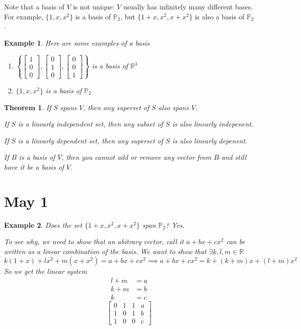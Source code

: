 \documentclass[11pt]{article}
\newtheorem{thm}{Theorem}
\newtheorem{ex}{Example}
\begin{document}
Note that a basis of $V$ is not unique: $V$ usually has infinitely many different bases.
For example, $\{1,x,x^{2}\}$ is a basis of $\mathbb{P}_{2}$, but $\{1 + x, x^{2}, x + x^{2}\}$ is also a basis of $\mathbb{P}_{2}$.
\begin{ex}
  Here are some examples of a basis
  \begin{enumerate}
    \item $\left\{\begin{bmatrix} 1 \\ 0 \\ 0 \end{bmatrix}, \begin{bmatrix} 0 \\ 1 \\ 0 \end{bmatrix}, \begin{bmatrix} 0 \\ 0 \\ 1 \end{bmatrix}\right\}$ is a basis of $\mathbb{R}^{3}$
    \item $\{1, x, x^{2}\}$ is a basis of $\mathbb{P}_{2}$

  \end{enumerate}
\end{ex}

\begin{thm}
  If $S$ spans $V$, then any superset of $S$ also spans $V$.

  If $S$ is a linearly independent set, then any subset of $S$ is also linearly indepenent.

  If $S$ is a linearly dependent set, then any superset of $S$ is also linearly depenent.

  If $B$ is a basis of $V$, then you cannot add or remove any vector from $B$ and still have it be a basis of $V$.
\end{thm}
\section{May 1}
\begin{ex}
  Does the set $\{1+x, x^{2},x+x^{2}\}$ span $\mathbb{P}_{2}$? Yes.

  To see why, we need to show that an abitrary vector, call it $a + bx + cx^{2}$ can be written as a linear combination of the basis.
  We want to show that $\exists k,l,m \in \mathbb{R}$
  \[k(1+x) + lx^{2} + m(x + x^{2}) = a + bx + cx^{2} \implies a + bx  + cx^{2} = k + (k + m) x + (l + m)x^{2}\]
  So we get the linear system
  \begin{align*}
    l + m &=a \\
    k + m &= b \\
    k &= c
  \end{align*}
  \[\begin{bmatrix} 0 & 1 & 1  & a\\ 1 & 0 & 1 & b \\ 1 & 0 & 0 & c \end{bmatrix} \]
\end{ex}
\end{document}
